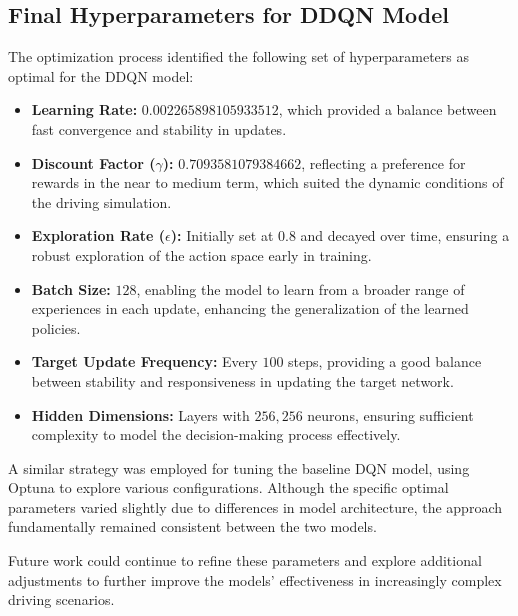 \documentclass{article}
\begin{document}
\subsection*{Final Hyperparameters for DDQN Model}
The optimization process identified the following set of hyperparameters as optimal for the DDQN model:

\begin{itemize}
    \item \textbf{Learning Rate:} \(0.002265898105933512\), which provided a balance between fast convergence and stability in updates.
    \item \textbf{Discount Factor (\(\gamma\)):} \(0.7093581079384662\), reflecting a preference for rewards in the near to medium term, which suited the dynamic conditions of the driving simulation.
    \item \textbf{Exploration Rate (\(\epsilon\)):} Initially set at \(0.8\) and decayed over time, ensuring a robust exploration of the action space early in training.
    \item \textbf{Batch Size:} \(128\), enabling the model to learn from a broader range of experiences in each update, enhancing the generalization of the learned policies.
    \item \textbf{Target Update Frequency:} Every \(100\) steps, providing a good balance between stability and responsiveness in updating the target network.
    \item \textbf{Hidden Dimensions:} Layers with \(256, 256\) neurons, ensuring sufficient complexity to model the decision-making process effectively.
\end{itemize}

A similar strategy was employed for tuning the baseline DQN model, using Optuna to explore various configurations. Although the specific optimal parameters varied slightly due to differences in model architecture, the approach fundamentally remained consistent between the two models.

Future work could continue to refine these parameters and explore additional adjustments to further improve the models' effectiveness in increasingly complex driving scenarios.
\end{document}
